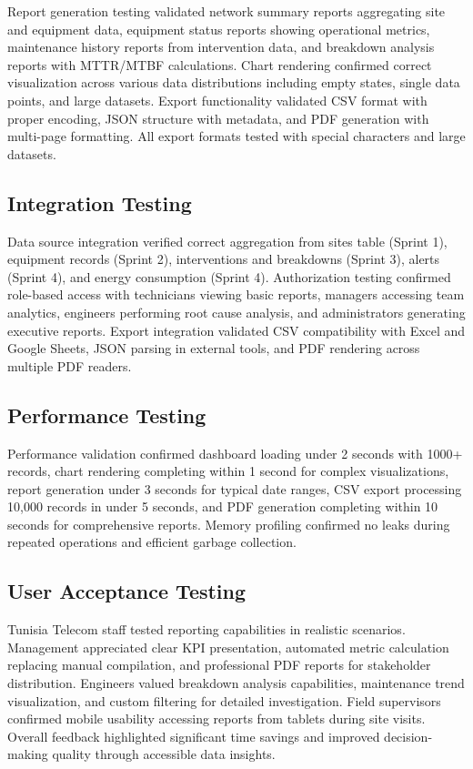 Report generation testing validated network summary reports aggregating site and equipment data, equipment status reports showing operational metrics, maintenance history reports from intervention data, and breakdown analysis reports with MTTR/MTBF calculations. Chart rendering confirmed correct visualization across various data distributions including empty states, single data points, and large datasets. Export functionality validated CSV format with proper encoding, JSON structure with metadata, and PDF generation with multi-page formatting. All export formats tested with special characters and large datasets.

\subsection{Integration Testing}

Data source integration verified correct aggregation from sites table (Sprint 1), equipment records (Sprint 2), interventions and breakdowns (Sprint 3), alerts (Sprint 4), and energy consumption (Sprint 4). Authorization testing confirmed role-based access with technicians viewing basic reports, managers accessing team analytics, engineers performing root cause analysis, and administrators generating executive reports. Export integration validated CSV compatibility with Excel and Google Sheets, JSON parsing in external tools, and PDF rendering across multiple PDF readers.

\subsection{Performance Testing}

Performance validation confirmed dashboard loading under 2 seconds with 1000+ records, chart rendering completing within 1 second for complex visualizations, report generation under 3 seconds for typical date ranges, CSV export processing 10,000 records in under 5 seconds, and PDF generation completing within 10 seconds for comprehensive reports. Memory profiling confirmed no leaks during repeated operations and efficient garbage collection.

\subsection{User Acceptance Testing}

Tunisia Telecom staff tested reporting capabilities in realistic scenarios. Management appreciated clear KPI presentation, automated metric calculation replacing manual compilation, and professional PDF reports for stakeholder distribution. Engineers valued breakdown analysis capabilities, maintenance trend visualization, and custom filtering for detailed investigation. Field supervisors confirmed mobile usability accessing reports from tablets during site visits. Overall feedback highlighted significant time savings and improved decision-making quality through accessible data insights.


